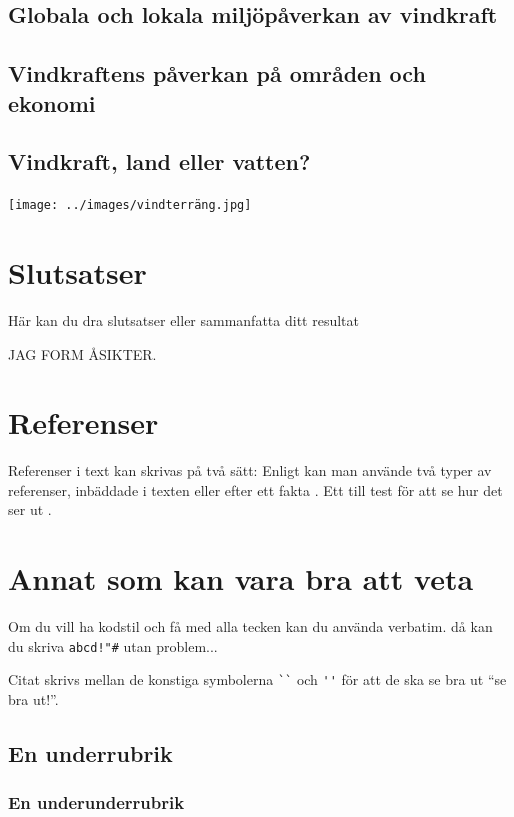 \documentclass[11p]{article}
\begin{document}
    \subsection{Globala och lokala miljöpåverkan av vindkraft}
    \subsection{Vindkraftens påverkan på områden och ekonomi}
    \subsection{Vindkraft, land eller vatten?}

    \texttt{[image: ../images/vindterräng.jpg]}

    \subsection{}

    \section{Slutsatser}
    Här kan du dra slutsatser eller sammanfatta ditt resultat

    JAG FORM ÅSIKTER.


    \section{Referenser}
    Referenser i text kan skrivas på två sätt: Enligt \textcite{Jens} kan man använde två typer av referenser, inbäddade i texten eller efter ett fakta \parencite{Fraenkel}. Ett till test för att se hur det ser ut \parencite[sid 55]{fermi}.

    \section{Annat som kan vara bra att veta}
    Om du vill ha kodstil och få med alla tecken kan du använda verbatim. då kan du skriva \verb|abcd!"#| utan problem...

    Citat skrivs mellan de konstiga symbolerna \verb|``| och \verb|''| för att de ska se bra ut ``se bra ut!''.
    \subsection{En underrubrik}
    \subsubsection{En underunderrubrik}
\end{document}

